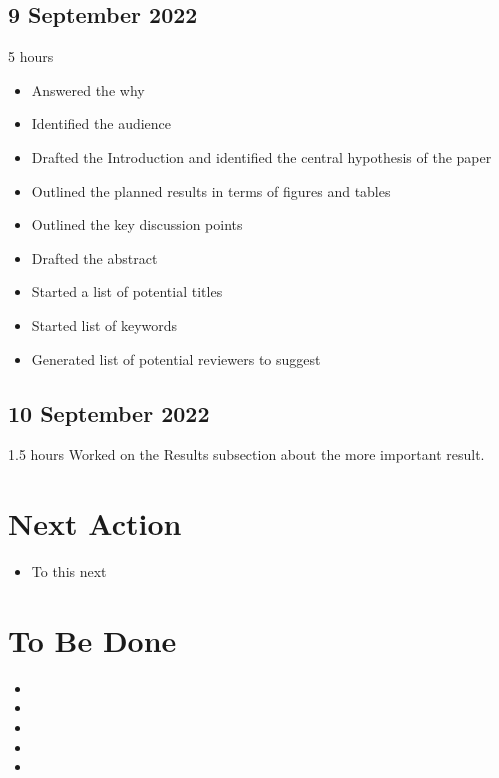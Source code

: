 \documentclass[11pt,letterpaper]{article}
\begin{document}
\subsection{9 September 2022}
\label{sec:org3bee405}
5 hours

\begin{itemize}
\item Answered the why
\item Identified the audience
\item Drafted the Introduction and identified the central hypothesis of the paper
\item Outlined the planned results in terms of figures and tables
\item Outlined the key discussion points
\item Drafted the abstract
\item Started a list of potential titles
\item Started list of keywords
\item Generated list of potential reviewers to suggest
\end{itemize}


\subsection{10 September 2022}
\label{sec:orgf27a3fd}
1.5 hours
Worked on the Results subsection about the more important result.


\section{Next Action}
\label{sec:orgdc57329}

\begin{itemize}
\item To this next
\end{itemize}

\section{To Be Done}
\label{sec:org48e6279}

\begin{itemize}
\item 

\item 

\item 

\item 

\item 
\end{itemize}
\end{document}
